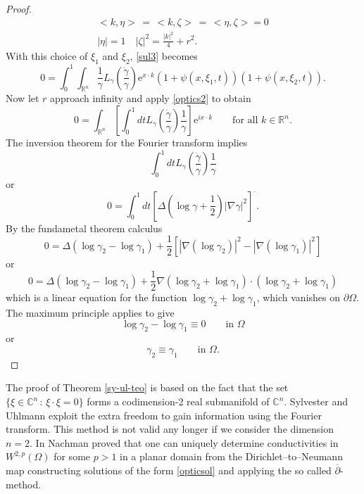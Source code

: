 \documentclass[10pt, a4paper, twoside, openright]{book}
\theoremstyle{definition}
\theoremstyle{plain}
\theoremstyle{plain}
\theoremstyle{plain}
\theoremstyle{plain}
\theoremstyle{plain}
\theoremstyle{plain}
\theoremstyle{plain}
\theoremstyle{plain}
\begin{document}
\begin{proof}
\begin{align*}
<k,\eta>\,=\,<k,\zeta>\,=\,<\eta,\zeta>=0\\
|\eta|=1\quad|\zeta|^2=\frac{|k|^2}{4}+r^2.
\end{align*}
With this choice of $\xi_1$ and $\xi_2$, \eqref{sul3} becomes
$$0=\int_0^1\int_{\mathbb{R}^n}\frac{1}{\gamma}
L_{\gamma}\left(\frac{\dot{\gamma}}{\gamma}\right)
\mathrm{e}^{x\cdot k}(1+\psi(x,\xi_1,t))
(1+\psi(x,\xi_2,t)).$$
Now let $r$ approach infinity and apply \eqref{optics2} to obtain
$$0=\int_{\mathbb{R}^n}\left[\int_0^1dtL_{\gamma}\left(\frac{\dot{\gamma}}{\gamma}\right)
\frac{1}{\gamma}
\right]\mathrm{e}^{ix\cdot k}\qquad\textrm{for all }k\in\mathbb{R}^n.$$
The inversion theorem for the Fourier transform implies
$$\int_0^1dtL_{\gamma}\left(\frac{\dot{\gamma}}{\gamma}\right)
\frac{1}{\gamma}$$
or
$$0=\int_0^1dt[\Delta(\log\gamma+\frac{1}{2})|\nabla\gamma|^2]^{\cdot}.$$
By the fundametal theorem calculus
$$0=\Delta(\log\gamma_2-\log\gamma_1)+\frac{1}{2}
\left[|\nabla(\log\gamma_2)|^2-|\nabla(\log\gamma_1)|^2\right]$$
or
$$0=\Delta(\log\gamma_2-\log\gamma_1)+\frac{1}{2}\nabla
(\log\gamma_2+\log\gamma_1)\cdot(\log\gamma_2+\log\gamma_1)$$
which is a linear equation for the function $\log\gamma_2+\log\gamma_1$, which vanishes
on $\partial\Omega$. The maximum principle applies to give
$$\log\gamma_2-\log\gamma_1\equiv0\qquad\textrm{in }\Omega$$
or
$$\gamma_2\equiv\gamma_1\qquad\textrm{in }\Omega.$$
\end{proof}


The proof of Theorem \ref{sy-ul-teo} is based on the fact that
the set $\{\xi\in\mathbb{C}^n\,:\,\xi\cdot\xi=0\}$
forms a codimension-2 real submanifold of $\mathbb{C}^n$.
Sylvester and Uhlmann exploit the extra freedom to gain information
using the Fourier transform.
This method is not valid any longer if we consider the dimension $n=2$.
In \cite{Na96} Nachman proved that one can uniquely determine conductivities
in $W^{2,p}(\Omega)$ for some $p>1$ in a planar domain from
the Dirichlet--to--Neumann map constructing solutions of the
form \eqref{opticsol} and applying the so called
$\overline{\partial}$-method.
\end{document}
